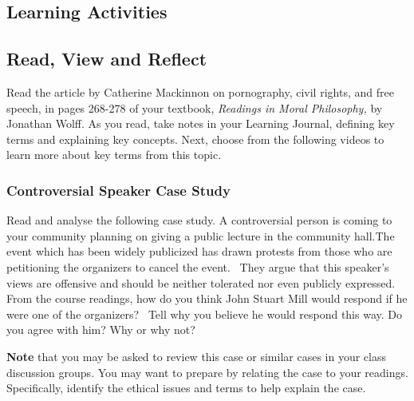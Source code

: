 \documentclass[
]{book}
\begin{document}
\hypertarget{learning-activities-12}{%
\subsection*{Learning Activities}\label{learning-activities-12}}

\begin{reflect}
\hypertarget{read-view-and-reflect-16}{%
\subsection*{Read, View and Reflect}\label{read-view-and-reflect-16}}

Read the article by Catherine Mackinnon on pornography, civil rights, and free
speech, in pages 268-278 of your textbook, \emph{Readings in Moral Philosophy,} by
Jonathan Wolff. As you read, take notes in your Learning Journal, defining key
terms and explaining key concepts.
Next, choose from the following videos to learn more about key terms from this
topic.

\hypertarget{controversial-speaker-case-study-1}{%
\subsubsection*{Controversial Speaker Case Study}\label{controversial-speaker-case-study-1}}

Read and analyse the following case study.
A controversial person is coming to your community planning on giving a public lecture in the community hall.The event which has been widely publicized has drawn protests from those who are petitioning the organizers to cancel the event. ~They argue that this speaker's views are offensive and should be neither tolerated nor even publicly expressed. From the course readings, how do you think John Stuart Mill would respond if he were one of the organizers? ~Tell why you believe he would respond this way. Do you agree with him? Why or why not?
\end{reflect}

\begin{caution}
\textbf{Note} that you may be asked to review this case or similar cases in your class discussion groups. You may want to prepare by relating the case to your readings. Specifically, identify the ethical issues and terms to help explain the case.
\end{caution}
\end{document}
